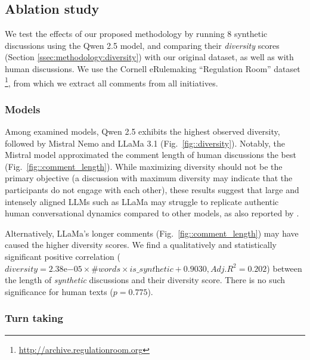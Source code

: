\subsection{Ablation study}
\label{ssec:results:ablation}

We test the effects of our proposed methodology by running $8$ synthetic discussions using the Qwen 2.5 model, and comparing their \textit{diversity} scores (Section \ref{ssec:methodology:diversity}) with our original dataset, as well as with human discussions. We use the Cornell eRulemaking “Regulation Room” dataset \footnote{\url{http://archive.regulationroom.org}}, from which we extract all comments from all initiatives. 



\subsubsection{Models}

Among examined models, Qwen 2.5 exhibits the highest observed diversity, followed by Mistral Nemo and LLaMa 3.1 (Fig.~\ref{fig::diversity}). Notably, the Mistral model approximated the comment length of human discussions the best (Fig.~\ref{fig::comment_length}). While maximizing diversity should not be the primary objective (a discussion with maximum diversity may indicate that the participants do not engage with each other), these results suggest that large and intensely aligned \acp{LLM} such as LLaMa may struggle to replicate authentic human conversational dynamics compared to other models, as also reported by \citep{Park2023GenerativeAI}.

Alternatively, LLaMa's longer comments (Fig.~\ref{fig::comment_length}) may have caused the higher diversity scores. We find a qualitatively and statistically significant positive correlation ($\textit{diversity} = 2.38\mathrm{e}{-05} \times \textit{\#words} \times \textit{is\_synthetic} + 0.9030, Adj. R^2=0.202$) between the length of \textit{synthetic} discussions and their diversity score. There is no such significance for human texts ($p=0.775$).


\subsubsection{Turn taking}

